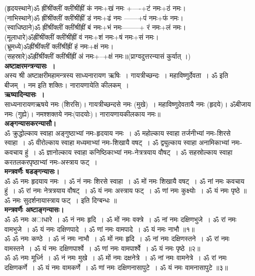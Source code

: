 \documentclass[twoside,top=1.7cm, bottom=1.7cm, outer=1cm,landscape, inner=1.5cm,a5paper,]{book}
\begin{document}
(हृदयस्थाने)ॐ ह्रींश्रींक्लीं क्लींश्रींह्रीं कं नमः+खं नमः +----+टं नमः+ठं नमः।\\
(नाभिस्थाने)ॐ ह्रींश्रींक्लीं क्लींश्रींह्रीं डं नमः+ढं नमः ------+पं नमः+फं नमः। \\
(स्वाधिष्ठाने)ॐ ह्रींश्रींक्लीं क्लींश्रींह्रीं बं नमः+भं नमः--------+ रं नमः+लं नमः। \\
(मूलाधारे)ॐह्रींश्रींक्लीं क्लींश्रींह्रीं वं नमः+शं नमः+षं नमः+सं नमः।\\
(भ्रूमध्ये)ॐह्रींश्रींक्लीं क्लींश्रींह्रीं हं नमः+क्षं नमः।\\
(सहस्रारे)ॐह्रींश्रींक्लीं क्लींश्रींह्रीं अं नमः+--+क्षं नमः॥(प्राग्वदुत्तरन्यासं कुर्यात् ।)\\
{\bfseries अष्टाक्षरमन्त्रन्यासः~।}\\
अस्य श्री अष्टाक्षरीमहामन्त्रस्य साध्यनारायण ऋषिः~। गायत्रीच्छन्दः~। महाविष्णुर्देवता~। ॐ इति बीजम्~। नम इति शक्तिः। नारायणायेति कीलकम्~।\\
{\bfseries ऋष्यादिन्यासः~।}\\
साध्यनारायणऋषये नमः (शिरसि)। गायत्रीच्छन्दसे नमः (मुखे)~। महाविष्णुदेवतायै नमः (हृदये)। ॐबीजाय नमः (गुह्ये)। नमश्शक्तये नमः(पादयोः)।
नारायणायकीलकाय नमः॥\\
{\bfseries अङ्गन्यासकरन्यासौ।}\\
ॐ क्रुद्धोल्काय स्वाहा अङ्गुष्ठाभ्यां नमः-हृदयाय नमः~। 
ॐ महोल्काय स्वाहा तर्जनीभ्यां नमः-शिरसे स्वाहा~।
ॐ वीरोल्काय स्वाहा मध्यमाभ्यां नमः-शिखायै वषट्~।
ॐ द्व्युल्काय स्वाहा अनामिकाभ्यां नमः-कवचाय हुं~।
ॐ ज्ञानोल्काय स्वाहा कनिष्ठिकाभ्यां नमः-नेत्रत्रयाय वौषट्~।
ॐ सहस्रोल्काय स्वाहा करतलकरपृष्ठाभ्यां नमः-अस्त्राय फट्~।\\[10pt]
{\bfseries मन्त्रवर्णैः षडङ्गन्यासः।}\\
ॐ ॐ नमः हृदयाय नमः~। ॐ नं नमः शिरसे स्वाहा~। ॐ मों नमः शिखायै वषट्~। ॐ नां नमः कवचाय हुं~। ॐ रां नमः नेत्रत्रयाय वौषट्~। ॐ यं नमः अस्त्राय फट्~। ॐ णां नमः कुक्ष्योः~। ॐ यं नमः पृष्ठे ॥\\
ॐ नमः सुदर्शनायास्त्राय फट्~। इति दिग्बन्धः ॥\\[10pt]
{\bfseries मन्त्रवर्णैः अष्टाङ्गन्यासः।}\\
ॐ ॐ नमः अाधारे~। ॐ नं नमः हृदि~। ॐ मों नमः वक्त्रे~। ॐ नां नमः दक्षिणभुजे~। ॐ रां नमः वामभुजे~। ॐ यं नमः दक्षिणपादे~। ॐ णां नमः वामपादे~। ॐ यं नमः नाभौ ॥१॥\\
ॐ ॐ नमः कण्ठे~। ॐ नं नमः नाभौ~। ॐ मों नमः हृदि~। ॐ नां नमः दक्षिणस्तने~। ॐ रां नमः वामस्तने~। ॐ यं नमः दक्षिणपार्श्वे~। ॐ णां नमः वामपार्श्वेे~। ॐ यं नमः पृष्ठे ॥२॥\\[10pt]
ॐ ॐ नमः मूर्ध्नि~। ॐ नं नमः मुखे~। ॐ मों नमः दक्षनेत्रे~। ॐ नां नमः वामनेत्रे~। ॐ रां नमः दक्षिणकर्णे~। ॐ यं नमः वामकर्णे~। ॐ णां नमः दक्षिणनासापुटे~। ॐ यं नमः वामनासापुटे ॥३॥\\[10pt]
\end{document}
